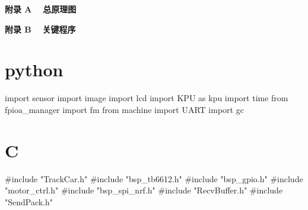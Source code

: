 
\appendix

\clearpage
{}
{}
\vspace*{-1.5ex}
\begin{center} \heiti \chpzihao \bfseries 附录 A ~ 总原理图 \end{center}


\renewcommand{\thesection}{A.\arabic{section}}


\clearpage
{}
{}
\vspace*{-1.5ex}
\begin{center} \heiti \chpzihao \bfseries 附录 B ~ 关键程序 \end{center}
\renewcommand{\thesection}{B.\arabic{section}}
\section{python}
\begin{python}
import sensor
import image
import lcd
import KPU as kpu
import time
from fpioa_manager import fm
from machine import UART
import gc


\end{python}
\section{C}
\begin{c++}
#include "TrackCar.h"
#include "bsp_tb6612.h"
#include "bsp_gpio.h"
#include "motor_ctrl.h"
#include "bsp_spi_nrf.h"
#include "RecvBuffer.h"
#include "SendPack.h"

\end{c++}

